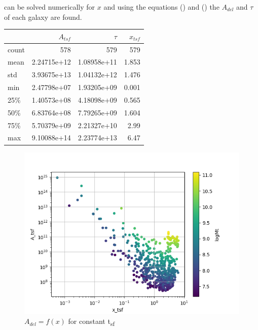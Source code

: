 \documentclass[a4paper,twocolumn]{article}
\begin{document}
can be solved numerically for \(x\) and using the equations () and () the \(A_{del}\) and \(\tau\) of each galaxy are found.




\begin{center}
\begin{tabular}{lrrr}
 & \(A_{tsf}\) & \(\tau\) & \(x_{tsf}\)\\[0pt]
\hline
count & 578 & 579 & 579\\[0pt]
mean & 2.24715e+12 & 1.08958e+11 & 1.853\\[0pt]
std & 3.93675e+13 & 1.04132e+12 & 1.476\\[0pt]
min & 2.47798e+07 & 1.93205e+09 & 0.001\\[0pt]
25\% & 1.40573e+08 & 4.18098e+09 & 0.565\\[0pt]
50\% & 6.83764e+08 & 7.79265e+09 & 1.604\\[0pt]
75\% & 5.70379e+09 & 2.21327e+10 & 2.99\\[0pt]
max & 9.10088e+14 & 2.23774e+13 & 6.47\\[0pt]
\end{tabular}
\end{center}


\begin{figure}[!htpb]
\centering
\includegraphics[width=.9\linewidth]{./figs/x-A_tsf.png}
\caption{\label{fig:$A_{del} = f(x)$ for constant t_{sf}}\(A_{del} = f(x)\) for constant t\textsubscript{sf}}
\end{figure}
\end{document}

